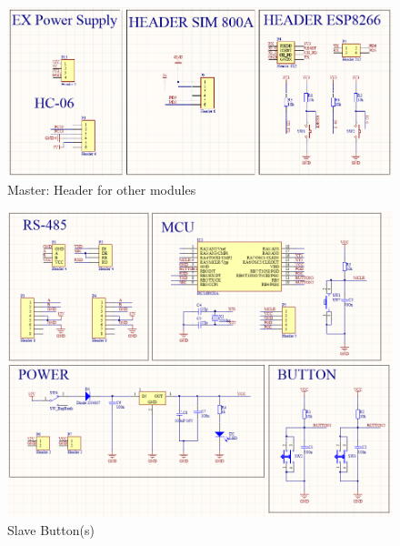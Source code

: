 \begin{figure}[!ht]
  \begin{center}
  \includegraphics[scale=0.7]{images/masterLeft.PNG}
  \caption{Master: Header for other modules}
  \label{fig:masterLeftFull}
  \end{center}
\end{figure}
\begin{figure}[!ht]
  \begin{center}
  \includegraphics[scale=0.7]{images/slaveButtonFull.PNG}
  \caption{Slave Button(s)}
  \label{fig:slaveButtonFull}
  \end{center}
\end{figure}
